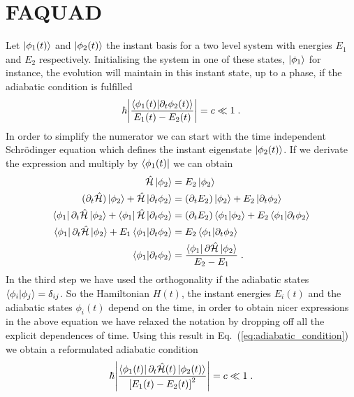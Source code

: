 \section{FAQUAD}
Let $\ket{\phi_1(t)}$ and $\ket{\phi_2(t)}$ the instant basis for a two level system with energies $E_1$ and $E_2$ respectively. Initialising the system in one of these states, $\ket{\phi_1}$ for instance, the evolution will maintain in this instant state, up to a phase, if the adiabatic condition is fulfilled \cite{Schiff1968}
\begin{equation}
	\hbar\abs{\frac{\braket{\phi_1(t)}{\partial_t\phi_2(t)}}{E_1(t)-E_2(t)}}=c\ll 1\;.
	\label{eq:adiabatic_condition}
\end{equation}
In order to simplify the numerator we can start with the time independent Schrödinger equation which defines the instant eigenstate $\ket{\phi_2(t)}$. If we derivate the expression and multiply by $\bra{\phi_1(t)}$ we can obtain
\begin{equation}
	\begin{split}
	\hat{\mathcal{H}}\ket{\phi_2}&=E_2\ket{\phi_2}\\
	(\partial_t \hat{\mathcal{H}})\ket{\phi_2}+\hat{\mathcal{H}}\ket{\partial_t\phi_2}&=(\partial_t E_2)\ket{\phi_2}+E_2\ket{\partial_t\phi_2}\\
	\bra{\phi_1}\partial_t \hat{\mathcal{H}}\ket{\phi_2}+\bra{\phi_1}\hat{\mathcal{H}}\ket{\partial_t \phi_2}&=(\partial_t E_2)\braket{\phi_1}{\phi_2}+E_2\braket{\phi_1}{\partial_t \phi_2}\\
	\bra{\phi_1}\partial_t \hat{\mathcal{H}}\ket{\phi_2}+E_1\braket{\phi_1}{\partial_t\phi_2}&=E_2\braket{\phi_1}{\partial_t\phi_2}\\
	\braket{\phi_1}{\partial_t \phi_2}&=\frac{\bra{\phi_1}\partial \hat{\mathcal{H}}\ket{\phi_2}}{E_2-E_1}\; .
	\end{split}
\end{equation}
In the third step we have used the orthogonality if the adiabatic states $\braket{\phi_i}{\phi_j}=\delta_{ij}$. So the Hamiltonian $H(t)$, the instant energies $E_i(t)$ and the adiabatic states $\phi_i(t)$ depend on the time, in order to obtain nicer expressions in the above equation we have relaxed the notation by dropping off all the explicit dependences of time. Using this result in Eq.~(\ref{eq:adiabatic_condition}) we obtain a reformulated adiabatic condition
\begin{equation}
	\hbar\abs{\frac{\bra{\phi_1(t)}\partial_t \hat{\mathcal{H}}(t)\ket{\phi_2(t)}}{\left[E_1(t)-E_2(t)\right]^2}}=c\ll 1\; .
\end{equation}

